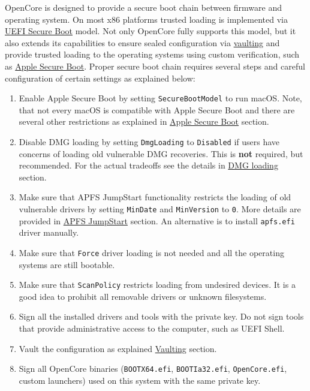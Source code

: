 \documentclass[]{article}
\begin{document}
OpenCore is designed to provide a secure boot chain between firmware
and operating system. On most x86 platforms trusted loading is implemented
via \href{https://en.wikipedia.org/wiki/UEFI_Secure_Boot}{UEFI Secure Boot} model.
Not only OpenCore fully supports this model, but it also extends its capabilities
to ensure sealed configuration via \hyperref[securevaulting]{vaulting} and
provide trusted loading to the operating systems using custom verification,
such as \hyperref[secureapplesb]{Apple Secure Boot}. Proper secure boot chain
requires several steps and careful configuration of certain settings as explained below:

\begin{enumerate}
\item Enable Apple Secure Boot by setting \texttt{SecureBootModel} to
  run macOS. Note, that not every macOS is compatible with Apple Secure Boot and
  there are several other restrictions as explained in
  \hyperref[secureapplesb]{Apple Secure Boot} section.
\item Disable DMG loading by setting \texttt{DmgLoading} to \texttt{Disabled}
  if users have concerns of loading old vulnerable DMG recoveries. This is
  \textbf{not} required, but recommended. For the actual tradeoffs
  see the details in \hyperref[securedmgloading]{DMG loading} section.
\item Make sure that APFS JumpStart functionality restricts the loading
  of old vulnerable drivers by setting \texttt{MinDate} and \texttt{MinVersion}
  to \texttt{0}. More details are provided in \hyperref[uefiapfsprops]{APFS JumpStart}
  section. An alternative is to install \texttt{apfs.efi} driver manually.
\item Make sure that \texttt{Force} driver loading is not needed and
  all the operating systems are still bootable.
\item Make sure that \texttt{ScanPolicy} restricts loading from undesired
  devices. It is a good idea to prohibit all removable drivers or unknown
  filesystems.
\item Sign all the installed drivers and tools with the private key. Do not sign
  tools that provide administrative access to the computer, such as UEFI Shell.
\item Vault the configuration as explained \hyperref[securevaulting]{Vaulting}
  section.
\item Sign all OpenCore binaries (\texttt{BOOTX64.efi}, \texttt{BOOTIa32.efi},
  \texttt{OpenCore.efi}, custom launchers) used on this system with
  the same private key.

\end{enumerate}
\end{document}
